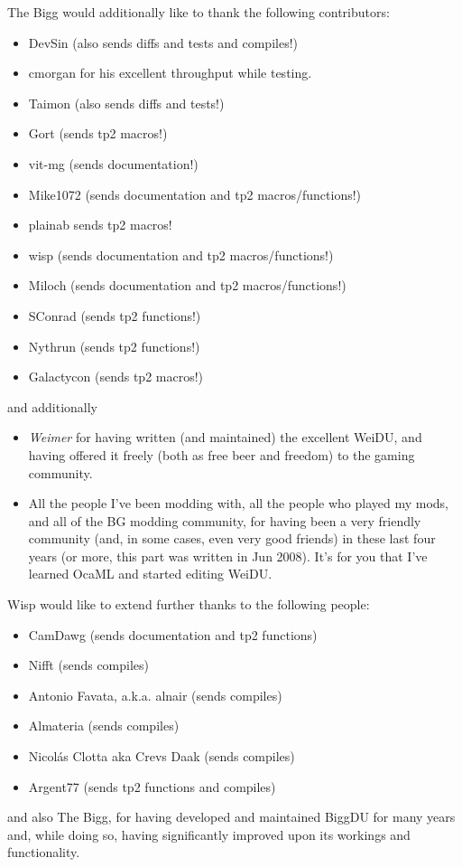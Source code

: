 \documentclass{article}
\begin{document}
The Bigg would additionally like to thank the following contributors:
\begin{itemize}
\item DevSin (also sends diffs and tests and compiles!)
\item cmorgan for his excellent throughput while testing.
\item Taimon (also sends diffs and tests!)
\item Gort (sends tp2 macros!)
\item vit-mg (sends documentation!)
\item Mike1072 (sends documentation and tp2 macros/functions!)
\item plainab {sends tp2 macros!}
\item wisp (sends documentation and tp2 macros/functions!)
\item Miloch (sends documentation and tp2 macros/functions!)
\item SConrad (sends tp2 functions!)
\item Nythrun (sends tp2 functions!)
\item Galactycon (sends tp2 macros!)
\end{itemize}
and additionally
\begin{itemize}
\item {\em Weimer} for having written (and maintained) the excellent WeiDU,
and having offered it freely (both as free beer and freedom) to the gaming
community.
\item All the people I've been modding with, all the people who played my mods,
and all of the BG modding community, for having been a very friendly community
(and, in some cases, even very good friends) in these last four years (or more,
this part was written in Jun 2008). It's for you that I've learned OcaML and
started editing WeiDU.
\end{itemize}

Wisp would like to extend further thanks to the following people:
\begin{itemize}
\item CamDawg (sends documentation and tp2 functions)
\item Nifft (sends compiles)
\item Antonio Favata, a.k.a. alnair (sends compiles)
\item Almateria (sends compiles)
\item Nicolás Clotta aka Crevs Daak (sends compiles)
\item Argent77 (sends tp2 functions and compiles)
\end{itemize}
and also The Bigg, for having developed and maintained BiggDU for many years and, while doing so, having significantly improved upon its workings and functionality.
\end{document}
